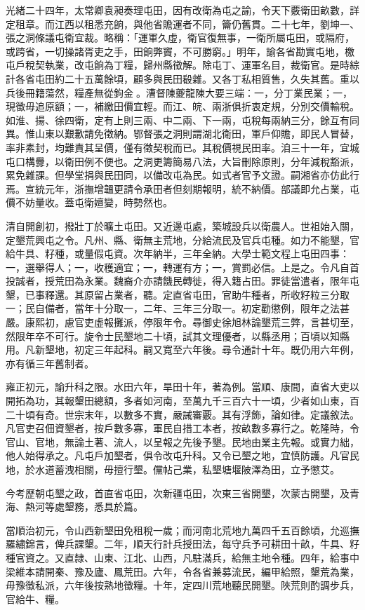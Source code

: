 \begin{pinyinscope}
光緒二十四年，太常卿袁昶奏理屯田，因有改衛為屯之諭，令天下覈衛田畝數，詳定租章。而江西以租悉充餉，與他省贍運者不同，籥仍舊貫。二十七年，劉坤一、張之洞條議屯衛宜裁。略稱：「運軍久虛，衛官復無事，一衛所屬屯田，或隔府，或跨省，一切操諸胥吏之手，田餉弊竇，不可勝窮。」明年，諭各省勘實屯地，檄屯戶稅契執業，改屯餉為丁糧，歸州縣徵解。除屯丁、運軍名目，裁衛官。是時綜計各省屯田約二十五萬餘頃，顧多與民田殽雜。又各丁私相質售，久失其舊。重以兵後冊籍蕩然，糧產無從鉤金。漕督陳夔龍陳大要三端：一，分丁業民業；一，現徵毋追原額；一，補繳田價宜輕。而江、皖、兩浙俱折衷定規，分別交價輸稅。如淮、揚、徐四衛，定有上則三兩、中二兩、下一兩，屯稅每兩納三分，餘互有同異。惟山東以艱歉請免徵納。鄂督張之洞則謂湖北衛田，軍戶仰贍，即民人冒替，率非素封，均難責其呈價，僅有徵契稅而已。其稅價視民田率。洎三十一年，宜城屯口構釁，以衛田例不便也。之洞更籌簡易八法，大旨刪除原則，分年減稅豁派，累免雜課。但學堂捐與民田同，以備改屯為民。如式者官予文證。嗣湘省亦仿此行焉。宣統元年，浙撫增韞更請令承田者但刻期報明，統不納價。部議即允占業，屯價不妨量收。蓋屯衛嬗變，時勢然也。

清自開創初，撥壯丁於曠土屯田。又近邊屯處，築城設兵以衛農人。世祖始入關，定墾荒興屯之令。凡州、縣、衛無主荒地，分給流民及官兵屯種。如力不能墾，官給牛具、籽種，或量假屯資。次年納半，三年全納。大學士範文程上屯田四事：一，選舉得人；一，收穫適宜；一，轉運有方；一，賞罰必信。上是之。令凡自首投誠者，授荒田為永業。魏裔介亦請饑民轉徙，得入籍占田。罪徒當遣者，限年屯墾，已事釋還。其原留占業者，聽。定直省屯田，官助牛種者，所收籽粒三分取一；民自備者，當年十分取一，二年、三年三分取一。初定勸懲例，限年之法甚嚴。康熙初，慮官吏虛報攤派，停限年令。尋御史徐旭林論墾荒三弊，言甚切至，然限年卒不可行。旋令士民墾地二十頃，試其文理優者，以縣丞用；百頃以知縣用。凡新墾地，初定三年起科。嗣又寬至六年後。尋令通計十年。既仍用六年例，亦有循三年舊制者。

雍正初元，諭升科之限。水田六年，旱田十年，著為例。當順、康間，直省大吏以開拓為功，其報墾田總額，多者如河南，至萬九千三百六十一頃，少者如山東，百二十頃有奇。世宗末年，以數多不實，嚴誡審覈。其有浮飾，論如律。定議敘法。凡官吏召佃資墾者，按戶數多寡，軍民自措工本者，按畝數多寡行之。乾隆時，令官山、官地，無論土著、流人，以呈報之先後予墾。民地由業主先報。或實力絀，他人始得承之。凡屯戶加墾者，俱令改屯升科。又令已墾之地，宜慎防護。凡官民地，於水道蓄洩相關，毋擅行墾。儻帖己業，私墾塘堰陂澤為田，立予懲艾。

今考歷朝屯墾之政，首直省屯田，次新疆屯田，次東三省開墾，次蒙古開墾，及青海、熱河等處墾務，悉具於篇。

當順治初元，令山西新墾田免租稅一歲；而河南北荒地九萬四千五百餘頃，允巡撫羅繡錦言，俾兵課墾。二年，順天行計兵授田法，每守兵予可耕田十畝，牛具、籽種官資之。又直隸、山東、江北、山西，凡駐滿兵，給無主地令種。四年，給事中梁維本請開秦、豫及廬、鳳荒田。六年，令各省兼募流民，編甲給照，墾荒為業，毋豫徵私派，六年後按熟地徵糧。十年，定四川荒地聽民開墾。陜荒則酌調步兵，官給牛、糧。


\end{pinyinscope}
